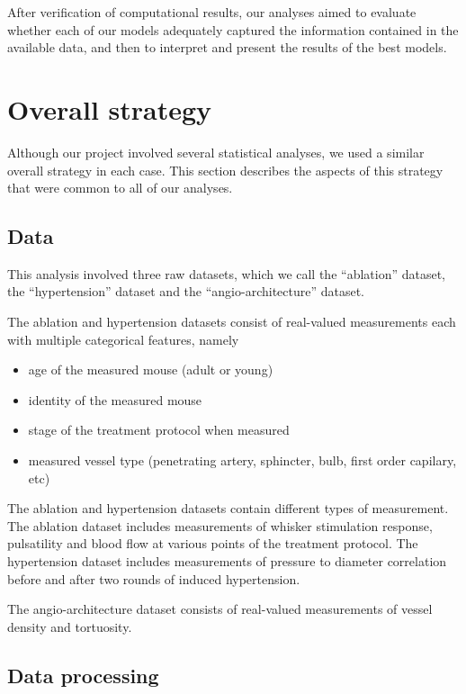 \documentclass[
  letterpaper,
  DIV=11,
  numbers=noendperiod,
  oneside]{scrartcl}
\providecommand{\tightlist}{%
  \setlength{\itemsep}{0pt}\setlength{\parskip}{0pt}}\usepackage{longtable,booktabs,array}
\theoremstyle{plain}
\theoremstyle{remark}
\begin{document}
After verification of computational results, our analyses aimed to
evaluate whether each of our models adequately captured the information
contained in the available data, and then to interpret and present the
results of the best models.

\section{Overall strategy}\label{overall-strategy}

Although our project involved several statistical analyses, we used a
similar overall strategy in each case. This section describes the
aspects of this strategy that were common to all of our analyses.

\subsection{Data}\label{data}

This analysis involved three raw datasets, which we call the
``ablation'' dataset, the ``hypertension'' dataset and the
``angio-architecture'' dataset.

The ablation and hypertension datasets consist of real-valued
measurements each with multiple categorical features, namely

\begin{itemize}
\tightlist
\item
  age of the measured mouse (adult or young)
\item
  identity of the measured mouse
\item
  stage of the treatment protocol when measured
\item
  measured vessel type (penetrating artery, sphincter, bulb, first order
  capilary, etc)
\end{itemize}

The ablation and hypertension datasets contain different types of
measurement. The ablation dataset includes measurements of whisker
stimulation response, pulsatility and blood flow at various points of
the treatment protocol. The hypertension dataset includes measurements
of pressure to diameter correlation before and after two rounds of
induced hypertension.

The angio-architecture dataset consists of real-valued measurements of
vessel density and tortuosity.

\subsection{Data processing}\label{data-processing}
\end{document}
